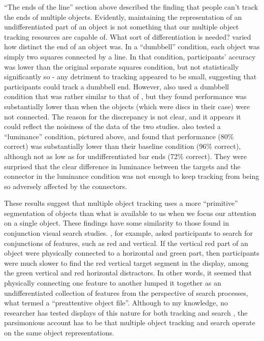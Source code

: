 \documentclass[
]{book}
\begin{document}
``The ends of the line'' section above described the finding that people can't track the ends of multiple objects. Evidently, maintaining the representation of an undifferentiated part of an object is not something that our multiple object tracking resources are capable of. What sort of differentiation is needed? \citet{schollWhatVisualObject2001} varied how distinct the end of an object was. In a ``dumbbell'' condition, each object was simply two squares connected by a line. In that condition, participants' accuracy was lower than the original separate squares condition, but not statistically significantly so - any detriment to tracking appeared to be small, suggesting that participants could track a dumbbell end. However, \citet{howeCanAttentionBe2012} also used a dumbbell condition that was rather similar to that of \citet{schollWhatVisualObject2001}, but they found performance was substantially lower than when the objects (which were discs in their case) were not connected. The reason for the discrepancy is not clear, and it appears it could reflect the noisiness of the data of the two studies. \citet{howeCanAttentionBe2012} also tested a ``luminance'' condition, pictured above, and found that performance (80\% correct) was substantially lower than their baseline condition (96\% correct), although not as low as for undifferentiated bar ends (72\% correct). They were surprised that the clear difference in luminance between the targets and the connector in the luminance condition was not enough to keep tracking from being so adversely affected by the connectors.

These results suggest that multiple object tracking uses a more ``primitive'' segmentation of objects than what is available to us when we focus our attention on a single object. These findings have some similarity to those found in conjunction visual search studies. \citet{wolfePreattentiveObjectFiles1997}, for example, asked participants to search for conjunctions of features, such as red and vertical. If the vertical red part of an object were physically connected to a horizontal and green part, then participants were much slower to find the red vertical target segment in the display, among the green vertical and red horizontal distractors. In other words, it seemed that physically connecting one feature to another lumped it together as an undifferentiated collection of features from the perspective of search processes, what \citet{wolfePreattentiveObjectFiles1997} termed a ``preattentive object file''. Although to my knowledge, no researcher has tested displays of this nature for both tracking and search , the parsimonious account has to be that multiple object tracking and search operate on the same object representations.
\end{document}
